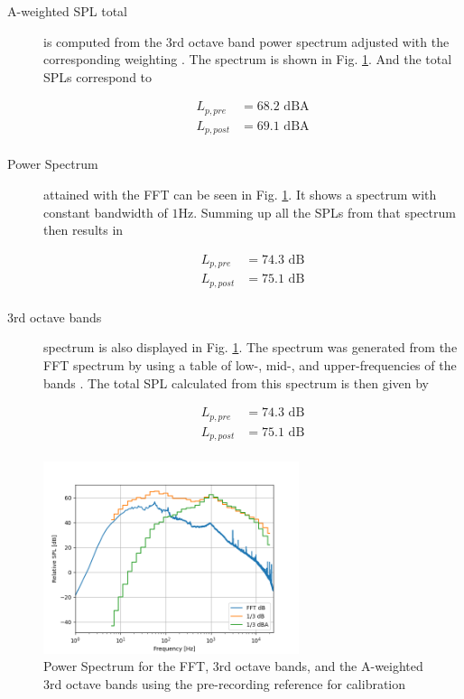 \documentclass[twocolumn]{article}
\begin{document}
\begin{description}
\item[A-weighted SPL total] is computed from the 3rd octave band power spectrum adjusted with the
    corresponding weighting \cite{1}.
    The spectrum is shown in Fig. \ref{fig:power_spectrum}.
    And the total SPLs correspond to

\begin{equation}
\begin{aligned}
    L_{p,pre} & = 68.2 \textrm{ dBA} \\
    L_{p,post} & = 69.1 \textrm{ dBA} \\
\end{aligned}
\end{equation}

\item[Power Spectrum] attained with the FFT can be seen in Fig. \ref{fig:power_spectrum}.
    It shows a spectrum with constant bandwidth of $1\textrm{Hz}$.
    Summing up all the SPLs from that spectrum then results in

\begin{equation}
\begin{aligned}
    L_{p,pre} & = 74.3 \textrm{ dB} \\
    L_{p,post} & = 75.1 \textrm{ dB} \\
\end{aligned}
\end{equation}

\item[3rd octave bands] spectrum is also displayed in Fig. \ref{fig:power_spectrum}.
    The spectrum was generated from the FFT spectrum by using a table of low-, mid-, and
    upper-frequencies of the bands \cite{2}.
    The total SPL calculated from this spectrum is then given by

\begin{equation}
\begin{aligned}
    L_{p,pre} & = 74.3 \textrm{ dB} \\
    L_{p,post} & = 75.1 \textrm{ dB} \\
\end{aligned}
\end{equation}

\end{description}

\begin{figure}[H]
    \centering
    \includegraphics[width=75mm]{./Images/spectrum_plot_step.png}
    \caption{Power Spectrum for the FFT, 3rd octave bands, and the A-weighted 3rd octave bands using the
    pre-recording reference for calibration}
    \label{fig:power_spectrum}
\end{figure}
\end{document}
